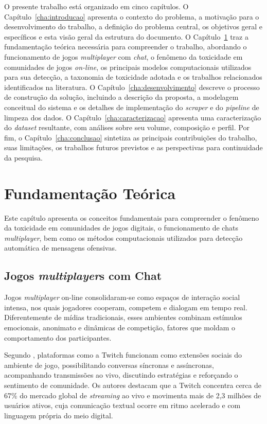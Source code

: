 \documentclass{eic-bcc-tcc}
\begin{document}
O presente trabalho está organizado em cinco capítulos. O Capítulo~\ref{cha:introducao} apresenta o contexto do problema, a motivação para o desenvolvimento do trabalho, a definição do problema central, os objetivos geral e específicos e esta visão geral da estrutura do documento. O Capítulo~\ref{cha:fundamentacao} traz a fundamentação teórica necessária para compreender o trabalho, abordando o funcionamento de jogos \textit{multiplayer} com \textit{chat}, o fenômeno da toxicidade em comunidades de jogos \textit{on-line}, os principais modelos computacionais utilizados para sua detecção, a taxonomia de toxicidade adotada e os trabalhos relacionados identificados na literatura. O Capítulo~\ref{cha:desenvolvimento} descreve o processo de construção da solução, incluindo a descrição da proposta, a modelagem conceitual do sistema e os detalhes de implementação do \textit{scraper} e do \textit{pipeline} de limpeza dos dados. O Capítulo~\ref{cha:caracterizacao} apresenta uma caracterização do \textit{dataset} resultante, com análises sobre seu volume, composição e perfil. Por fim, o Capítulo~\ref{cha:conclusao} sintetiza as principais contribuições do trabalho, suas limitações, os trabalhos futuros previstos e as perspectivas para continuidade da pesquisa.

\chapter{Fundamentação Teórica}
\label{cha:fundamentacao}

Este capítulo apresenta os conceitos fundamentais para compreender o fenômeno da toxicidade em comunidades de jogos digitais, o funcionamento de chats \textit{multiplayer}, bem como os métodos computacionais utilizados para detecção automática de mensagens ofensivas.

\section{Jogos \textit{multiplayer}s com Chat}

Jogos \textit{multiplayer}  on-line  consolidaram-se como espaços de interação social intensa, nos quais jogadores cooperam, competem e dialogam em tempo real. Diferentemente de mídias tradicionais, esses ambientes combinam estímulos emocionais, anonimato e dinâmicas de competição, fatores que moldam o comportamento dos participantes.

Segundo \cite{sbgames}, plataformas como a Twitch funcionam como extensões sociais do ambiente de jogo, possibilitando conversas síncronas e assíncronas, acompanhando transmissões ao vivo, discutindo estratégias e reforçando o sentimento de comunidade. Os autores destacam que a Twitch concentra cerca de 67\% do mercado global de \textit{streaming} ao vivo e movimenta mais de 2,3 milhões de usuários ativos, cuja comunicação textual ocorre em ritmo acelerado e com linguagem própria do meio digital.
\end{document}
